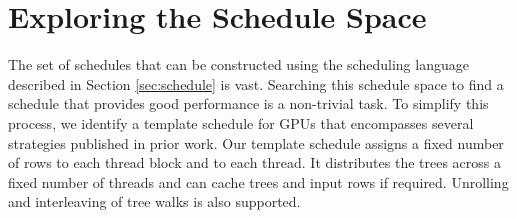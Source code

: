 \section{Exploring the Schedule Space}
\label{sec:exploring}


The set of schedules that can be constructed using the scheduling language described in 
Section \ref{sec:schedule} is vast. Searching this schedule space to find a schedule that
provides good performance is a non-trivial task. To simplify this process, we identify a
template schedule for GPUs that encompasses several strategies published in prior work.
Our template schedule assigns a fixed number of rows to each thread block and to each thread.
It distributes the trees across a fixed number of threads and can cache trees and 
input rows if required. Unrolling and interleaving of tree walks is also supported.

